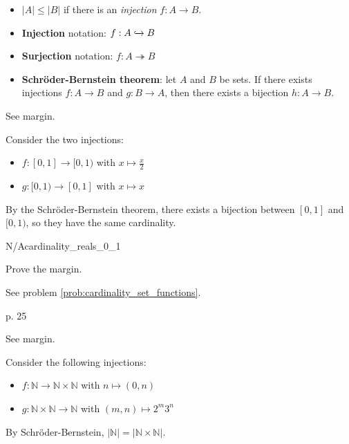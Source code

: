 \begin{itemize}
    \item $\lvert A \rvert \leq \lvert B \rvert$ if there is an \textit{injection} $f : A \to B$.
    \item \textbf{Injection} notation: $f : A \xhookrightarrow{} B$
    \item \textbf{Surjection} notation: $f : A \twoheadrightarrow B$
    \item \textbf{Schröder-Bernstein theorem}: let $A$ and $B$ be sets. If there exists injections $f : A \to B$ and $g : B \to A$, then there exists a bijection $h : A \to B$.
\end{itemize}

\begin{problem}{24}{}

    \marginnote{Show that $[0, 1]$ and $[0, 1)$ have the same cardinality.}

    See margin.

    \tcblower

    Consider the two injections:
    \begin{itemize}
        \item $f : [0, 1] \to [0, 1)$ \quad with \quad $x \mapsto \frac{x}{2}$
        \item $g : [0, 1) \to [0, 1]$ \quad with \quad $x \mapsto x$
    \end{itemize}
    By the Schröder-Bernstein theorem, there exists a bijection between $[0, 1]$ and $[0, 1)$, so they have the same cardinality.

\end{problem}

\begin{problem}{N/A}{cardinality_reals_0_1}


    Prove the margin.

    \tcblower

    See problem \ref{prob:cardinality_set_functions}.

\end{problem}

\begin{problem}{p. 25}{}


    See margin.

    \tcblower

    Consider the following injections:
    \begin{itemize}
        \item $f : \mathbb{N} \to \mathbb{N} \times \mathbb{N}$ \quad with \quad $n \mapsto (0, n)$
        \item $g : \mathbb{N} \times \mathbb{N} \to \mathbb{N}$ \quad with \quad $(m, n) \mapsto 2^m 3^n$
    \end{itemize}

    By Schröder-Bernstein, $\lvert \mathbb{N} \rvert = \lvert \mathbb{N} \times \mathbb{N} \rvert$.

\end{problem}

